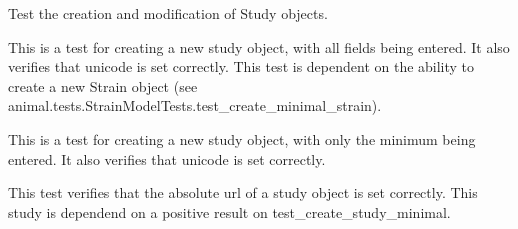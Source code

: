 \documentclass[letterpaper,10pt,english]{sphinxmanual}
\begin{document}
\begin{fulllineitems}
\label{data:mousedb.data.tests.StudyModelTests}
Test the creation and modification of Study objects.

\begin{fulllineitems}
\label{data:mousedb.data.tests.StudyModelTests.test_create_studey_detailed}
This is a test for creating a new study object, with all fields being entered.  It also verifies that unicode is set correctly.  This test is dependent on the ability to create a new Strain object (see animal.tests.StrainModelTests.test\_create\_minimal\_strain).

\end{fulllineitems}


\begin{fulllineitems}
\label{data:mousedb.data.tests.StudyModelTests.test_create_study_minimal}
This is a test for creating a new study object, with only the minimum being entered.  It also verifies that unicode is set correctly.

\end{fulllineitems}


\begin{fulllineitems}
\label{data:mousedb.data.tests.StudyModelTests.test_study_absolute_url}
This test verifies that the absolute url of a study object is set correctly.  This study is dependend on a positive result on test\_create\_study\_minimal.

\end{fulllineitems}


\end{fulllineitems}

\end{document}
